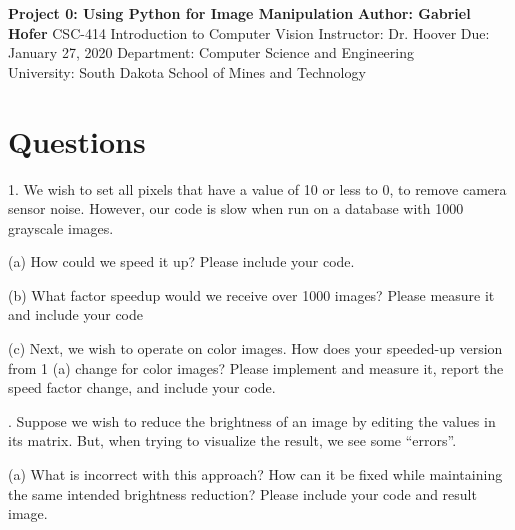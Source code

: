 \documentclass[12pt]{article}
\begin{document}
\begin{titlepage}
   \begin{center}
       \vspace*{1cm}
       \large
       \textbf{Project 0: Using Python for Image Manipulation}
       \normalsize
       \vspace{0.5cm}
       \textbf{Author: Gabriel Hofer}
       \vspace{0.5cm}
       CSC-414 Introduction to Computer Vision
       \vspace{0.5cm}
       Instructor: Dr. Hoover
       \vspace{0.5cm}
       Due: January 27, 2020
       \vfill
       Department: Computer Science and Engineering\\
       University: South Dakota School of Mines and Technology\\
   \end{center}
\end{titlepage}


\newpage
\section{Questions}
1. We wish to set all pixels that have a value of 10 or less to 0, to remove camera
sensor noise. However, our code is slow when run on a database with 1000
grayscale images.

(a) How could we speed it up? Please include your code.

(b) What factor speedup would we receive over 1000 images? Please measure it
and include your code

(c) Next, we wish to operate on color images. How does your speeded-up version
from 1 (a) change for color images? Please implement and measure it, report
the speed factor change, and include your code.

. Suppose we wish to reduce the brightness of an image by editing the values in its
matrix. But, when trying to visualize the result, we see some “errors”.

(a) What is incorrect with this approach? How can it be fixed while maintaining
the same intended brightness reduction? Please include your code and result
image.
\end{document}
